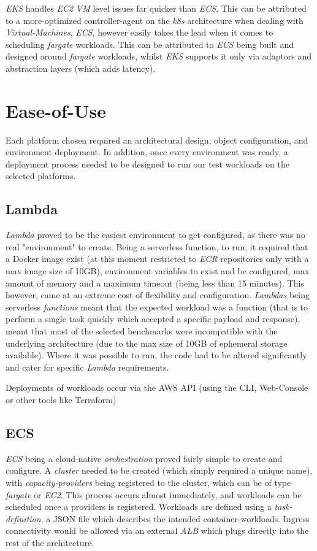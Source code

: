 \textit{EKS} handles \textit{EC2} \textit{VM} level issues far quicker than \textit{ECS}. This can be attributed to a more-optimized controller-agent on the \textit{k8s} architecture when dealing with \textit{Virtual-Machines}.
\textit{ECS}, however easily takes the lead when it comes to scheduling \textit{fargate} workloads. This can be attributed to \textit{ECS} being built and designed around \textit{fargate} workloads, whilst \textit{EKS}
supports it only via adaptors and abstraction layers (which adds latency).


\section{Ease-of-Use}
Each platform chosen required an architectural design, object configuration, and environment deployment.
In addition, once every environment was ready, a deployment process needed to be designed to run our test workloads on the selected platforms.

\subsection{Lambda}
\textit{Lambda} proved to be the easiest environment to get configured, as there was no real "environment" to create. Being a serverless function,
to run, it required that a Docker image exist (at this moment restricted to \textit{ECR} repositories only with a max image size of 10GB), environment variables to exist and be configured, max amount of memory
and a maximum timeout (being less than 15 minutes). This however, came at an extreme cost of flexibility and configuration.
\textit{Lambdas} being serverless \emph{functions} meant that the expected workload was a function (that is to perform a single task quickly which accepted a specific payload and response),
meant that most of the selected benchmarks were incompatible with the underlying architecture (due to the max size of 10GB of ephemeral storage available).
Where it was possible to run, the code had to be altered significantly and cater for specific \textit{Lambda} requirements.

Deployments of workloads occur via the AWS API (using the CLI, Web-Console or other tools like Terraform)

\subsection{ECS}
\textit{ECS} being a cloud-native \textit{orchestration} proved fairly simple to create and configure.
A \emph{cluster} needed to be created (which simply required a unique name), with \textit{capacity-providers} being registered to the cluster,
which can be of type \textit{fargate} or \textit{EC2}.
This process occurs almost immediately, and workloads can be scheduled once a providers is registered.
Workloads are defined using a \textit{task-definition}, a JSON file which describes the intended container-workloads.
Ingress connectivity would be allowed via an external \textit{ALB} which plugs directly into the rest of the architecture.

